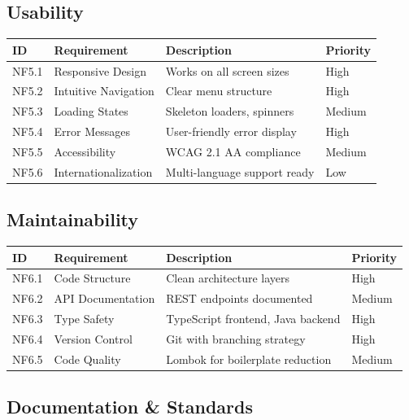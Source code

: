 \documentclass[
  12pt,
  a4paperpaper,
]{report}
\newcounter{none} %
\begin{document}
\subsection{Usability}\label{usability}

{\def\LTcaptype{none} %
\begin{longtable}[]{@{}llll@{}}
\hline
ID & Requirement & Description & Priority \\
\hline
\endhead
\hline
\endlastfoot
NF5.1 & Responsive Design & Works on all screen sizes & High \\
NF5.2 & Intuitive Navigation & Clear menu structure & High \\
NF5.3 & Loading States & Skeleton loaders, spinners & Medium \\
NF5.4 & Error Messages & User-friendly error display & High \\
NF5.5 & Accessibility & WCAG 2.1 AA compliance & Medium \\
NF5.6 & Internationalization & Multi-language support ready & Low \\
\end{longtable}
}

\subsection{Maintainability}
\label{maintainability}

{\def\LTcaptype{none} %
\begin{longtable}[]{@{}llll@{}}
\hline
ID & Requirement & Description & Priority \\
\hline
\endhead
\hline
\endlastfoot
NF6.1 & Code Structure & Clean architecture layers & High \\
NF6.2 & API Documentation & REST endpoints documented & Medium \\
NF6.3 & Type Safety & TypeScript frontend, Java backend & High \\
NF6.4 & Version Control & Git with branching strategy & High \\
NF6.5 & Code Quality & Lombok for boilerplate reduction & Medium \\
\end{longtable}
}


\subsection{Documentation \& Standards}
\label{documentation-standards}
\end{document}
